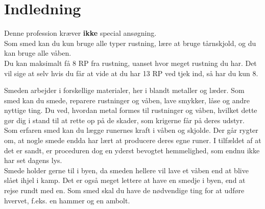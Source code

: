\chapter{Indledning}

Denne profession kræver \textbf{ikke} special ansøgning.\\
Som smed kan du kun bruge alle typer rustning, lære at bruge tårnskjold, og du kan bruge alle våben.\\
Du kan maksimalt få 8 RP fra rustning, uanset hvor meget rustning du har. Det vil sige at selv hvis du får at vide at du har 13 RP ved tjek ind, så har du kun 8.

Smeden arbejder i forskellige materialer, her i blandt metaller og læder. Som smed kan du smede, reparere rustninger og våben, lave smykker, låse og andre nyttige ting. Du ved, hvordan metal formes til rustninger og våben, hvilket dette gør dig i stand til at rette op på de skader, som krigerne får på deres udstyr.\\
Som erfaren smed kan du lægge runernes kraft i våben og skjolde. Der går rygter om, at nogle smede endda har lært at producere deres egne runer. I tilfældet af at det er sandt, er proceduren dog en yderst bevogtet hemmelighed, som endnu ikke har set dagens lys.\\
Smede holder gerne til i byen, da smeden hellere vil lave et våben end at blive slået ihjel i kamp. Det er også meget lettere at have en smedje i byen, end at rejse rundt med en. Som smed skal du have de nødvendige ting for at udføre hvervet, f.eks. en hammer og en ambolt.